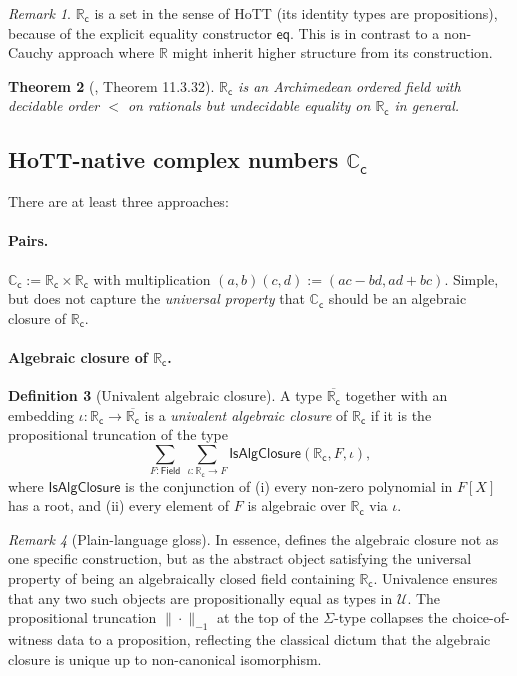 \documentclass[12pt]{article}
\newtheorem{theorem}{Theorem}[section]
\theoremstyle{definition}
\newtheorem{definition}[theorem]{Definition}
\theoremstyle{remark}
\newtheorem{remark}[theorem]{Remark}
\newcommand{\C}{\mathbb{C}}
\newcommand{\R}{\mathbb{R}}
\newcommand{\Cc}{\C_{\mathsf{c}}}
\newcommand{\Rc}{\R_{\mathsf{c}}}
\begin{document}
\begin{remark}
$\Rc$ is a set in the sense of HoTT (its identity types are propositions),
because of the explicit equality constructor $\mathsf{eq}$. This is in
contrast to a non-Cauchy approach where $\R$ might inherit higher structure
from its construction.
\end{remark}

\begin{theorem}[\cite{HoTTBook}, Theorem 11.3.32]\label{thm:RcArchimedean}
$\Rc$ is an Archimedean ordered field with decidable order $<$ on rationals
but undecidable equality on $\Rc$ in general.
\end{theorem}

\subsection{HoTT-native complex numbers \texorpdfstring{$\Cc$}{Cc}}

There are at least three approaches:

\paragraph{Pairs.}
$\Cc := \Rc \times \Rc$ with multiplication
$(a,b)(c,d) := (ac-bd, ad+bc)$. Simple, but does not capture the
\emph{universal property} that $\Cc$ should be an algebraic closure of $\Rc$.

\paragraph{Algebraic closure of $\Rc$.}
\begin{definition}[Univalent algebraic closure]\label{def:UAC}
A type $\overline{\Rc}$ together with an embedding $\iota:\Rc \to \overline{\Rc}$
is a \emph{univalent algebraic closure} of $\Rc$ if it is the propositional
truncation of the type
\[
  \sum_{F:\mathsf{Field}}\, \sum_{\iota:\Rc \to F} \mathsf{IsAlgClosure}(\Rc,F,\iota),
\]
where $\mathsf{IsAlgClosure}$ is the conjunction of (i) every non-zero
polynomial in $F[X]$ has a root, and (ii) every element of $F$ is algebraic
over $\Rc$ via $\iota$.
\end{definition}

\begin{remark}[Plain-language gloss]\label{rem:UACplain}
In essence,  defines the algebraic closure not as one
specific construction, but as the abstract object satisfying the universal
property of being an algebraically closed field containing $\Rc$. Univalence
ensures that any two such objects are propositionally equal as types in
$\mathcal{U}$. The propositional truncation $\|\cdot\|_{-1}$ at the top of
the $\Sigma$-type collapses the choice-of-witness data to a proposition,
reflecting the classical dictum that the algebraic closure is unique up to
non-canonical isomorphism.
\end{remark}
\end{document}
